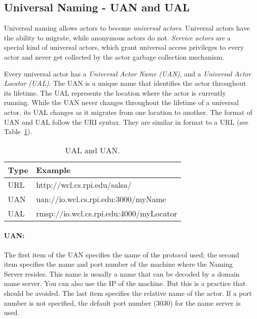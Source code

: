\subsection{Universal Naming - UAN and UAL}
Universal naming allows actors to become \textit{universal actors}. 
Universal actors have the ability to migrate, while
anonymous actors do not. \textit{Service actors} are a special kind of 
universal actors,
which grant universal access privileges to every actor
and never get collected by the actor garbage collection mechanism. 

Every universal actor has a \textit{Universal Actor Name (UAN)}, 
and a \textit{Universal Actor Locator (UAL)}. The UAN is a unique name 
that identifies the actor throughout its lifetime. The UAL 
represents the location where the actor 
is currently running. While the UAN never changes throughout 
the lifetime of a universal actor, its UAL changes as it migrates 
from one location to another. The format 
of UAN and UAL follow the URI syntax. They are similar in format to a 
URL (see Table~\ref{tbl2}).

\begin{table}[top]
\caption{UAL and UAN.}
\label{tbl2}        
\begin{center}
\begin{tabular}{|l|l|}
\hline
Type       & Example\\
\hline\hline
URL & http://wcl.cs.rpi.edu/salsa/ \\
\hline
UAN & uan://io.wcl.cs.rpi.edu:3000/myName \\
\hline
UAL & rmsp://io.wcl.cs.rpi.edu:4000/myLocator \\
\hline
\end{tabular}
\end{center}
\end{table}

\paragraph{UAN:} The first item of the UAN specifies the name of the protocol used; the second 
item specifies the name and port number of the machine where the Naming Server 
resides. This name is usually a name that can be decoded by a domain name server. 
You can also use the IP of the machine. But this is a practice that should be avoided. 
The last item specifies the relative name of the actor. If a port number is not specified, the 
default port number (3030) for the name server is used. 

